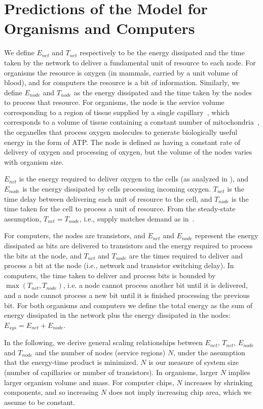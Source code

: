 \documentclass[12pt]{article}
\begin{document}
\section{Predictions of the Model for Organisms and Computers}

We define $E_{net}$ and $T_{net}$ respectively to be the energy dissipated and
the time taken by the network to deliver a fundamental unit of resource to each node.  For
organisms the resource is oxygen (in mammals, carried by a unit volume of
blood), and for computers the resource is a bit of information.
Similarly, we define $E_{node}$ and $T_{node}$ as the energy dissipated and the
time taken by the nodes to process that resource.  For organisms, the node is
the service volume corresponding to a region of tissue supplied by a single
capillary~\cite{banavar10}, which corresponds to a volume of tissue containing a constant number
of mitochondria~\cite{west2002allometric}, the organelles that process oxygen molecules to generate
biologically useful energy in the form of ATP.  The node is defined as having a constant
rate of delivery of oxygen and processing of oxygen, but the
volume of the nodes varies with organism size. 

$E_{net}$ is the energy required to deliver oxygen to the cells (as analyzed in
\cite{west97}), and $E_{node}$ is the energy dissipated by cells processing
incoming oxygen. $T_{net}$ is the time delay between delivering
each unit of resource to the cell, and $T_{node}$ is the time taken
for the cell to process a unit of resource. From the steady-state assumption, $T_{net} = T_{node}$,
i.e., supply matches demand as in~\cite{banavar10}.

For computers, the nodes are transistors, and 
$E_{net}$ and $E_{node}$ represent the energy dissipated as bits are delivered
to transistors and the energy required to process the bits at the node, and
$T_{net}$ and $T_{node}$ are the times required to deliver and process a bit at
the node (i.e., network and transistor switching delay).  In computers, the time
taken to deliver and process bits is bounded by $\max(T_{net},T_{node})$, i.e. a node cannot process another
bit until it is delivered, and a node cannot process a new bit until it is finished
processing the previous bit.   For
both organisms and computers we define the total energy as the sum of energy
dissipated in the network plus the energy dissipated in the nodes: $E_{sys} =
E_{net} + E_{node}$.

In the following, we derive general scaling relationships between $E_{net}$,
$T_{net}$, $E_{node}$ and $T_{node}$ and the number of nodes (service
regions) $N$, under the assumption that the energy-time product is minimized.  $N$ is our
measure of system size (number of capillaries or number of transistors). In organisms, larger $N$
implies larger organism volume and mass. For computer chips, $N$ increases by
shrinking components, and so increasing $N$ does not imply increasing chip
area, which we assume to be constant.
\end{document}
